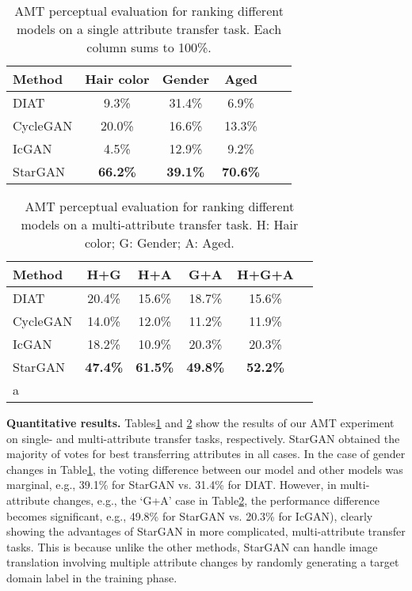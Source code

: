 \documentclass[10pt,twocolumn,letterpaper]{article}
\begin{document}
\begin{table}[ht]
\setlength{\tabcolsep}{10pt}
\begin{center}
\begin{tabular}{l c c c c c}
Method & Hair color & Gender & Aged \\
\hline
DIAT & 9.3\% & 31.4\% & 6.9\% \\
CycleGAN & 20.0\% & 16.6\% & 13.3\% \\
IcGAN & 4.5\% & 12.9\% & 9.2\% \\
StarGAN & \textbf{66.2\%} & \textbf{39.1\%} & \textbf{70.6\%} \\
\hline
\end{tabular}
\end{center}
\caption{AMT perceptual evaluation for ranking different models on a single attribute transfer task. Each column sums to 100\%.}
\label{table1}
\vspace{-0.1in}
\end{table}

\begin{table}[ht]
\begin{center}
\begin{tabular}{l c c c c c}
Method & H+G & H+A & G+A & H+G+A \\
\hline
DIAT & 20.4\% &15.6\% & 18.7\% & 15.6\% \\
CycleGAN & 14.0\% & 12.0\% & 11.2\% & 11.9\% \\
IcGAN & 18.2\% & 10.9\% & 20.3\% & 20.3\% \\
StarGAN & \textbf{47.4\%} & \textbf{61.5\%} & \textbf{49.8\%} & \textbf{52.2\%} \\
\hline
a\end{tabular}
\end{center}
\caption{AMT perceptual evaluation for ranking different models on a multi-attribute transfer task. H: Hair color; G: Gender; A: Aged.}
\label{table2}
\vspace{-0.1in}
\end{table}

\noindent\textbf{Quantitative results.} Tables\thinspace\ref{table1} and \ref{table2} show the results of our AMT experiment on single- and multi-attribute transfer tasks, respectively. StarGAN obtained the majority of votes for best transferring attributes in all cases. 
In the case of gender changes in Table\thinspace\ref{table1}, the voting difference between our model and other models was marginal, e.g., 39.1\% for StarGAN vs. 31.4\% for DIAT. However, in multi-attribute changes, e.g., the `G+A' case in Table\thinspace\ref{table2}, the performance difference becomes significant, e.g., 49.8\% for StarGAN vs. 20.3\% for IcGAN), clearly showing the advantages of StarGAN in more complicated, multi-attribute transfer tasks. This is because unlike the other methods, StarGAN can handle image translation involving multiple attribute changes by randomly generating a target domain label in the training phase. 
\end{document}

